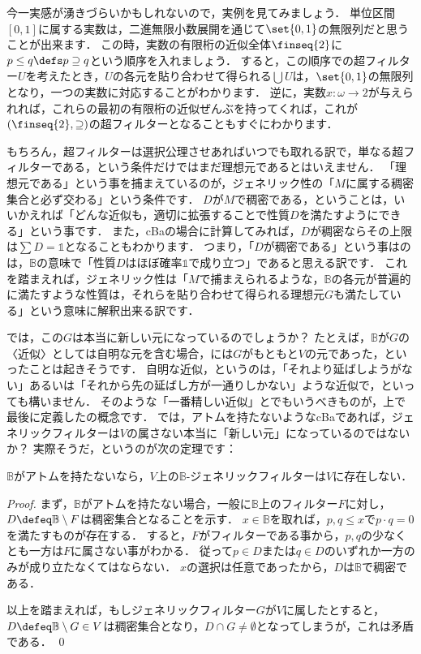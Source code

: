 \documentclass[a4j]{ltjsarticle}
\renewcommand{\emph}[1]{\textbf{\textgt{#1}}}
\begin{document}
今一実感が湧きづらいかもしれないので，実例を見てみましょう．
単位区間$[0,1]$に属する実数は，二進無限小数展開を通じて$\set{0, 1}$の無限列だと思うことが出来ます．
この時，実数の有限桁の近似全体$\finseq{2}$に$p \leq q \defs p \supseteq q$という順序を入れましょう．
すると，この順序での超フィルター$U$を考えたとき，$U$の各元を貼り合わせて得られる$\bigcup U$は，$\set{0, 1}$の無限列となり，一つの実数に対応することがわかります．
逆に，実数$x : \omega \to 2$が与えられれば，これらの最初の有限桁の近似ぜんぶを持ってくれば，これが$(\finseq{2}, \supseteq)$の超フィルターとなることもすぐにわかります．

もちろん，超フィルターは選択公理させあればいつでも取れる訳で，単なる超フィルターである，という条件だけではまだ理想元であるとはいえません．
「理想元である」という事を捕まえているのが，ジェネリック性の「$M$に属する稠密集合と必ず交わる」という条件です．
$D$が$M$で稠密である，ということは，いいかえれば「どんな近似も，適切に拡張することで性質$D$を満たすようにできる」という事です．
また，cBaの場合に計算してみれば，$D$が稠密ならその上限は$\sum D = \mathds{1}$となることもわかります．
つまり，「$D$が稠密である」という事はのは，$\mathbb{B}$の意味で「性質$D$はほぼ確率$\mathds{1}$で成り立つ」であると思える訳です．
これを踏まえれば，ジェネリック性は「$M$で捕まえられるような，$\mathbb{B}$の各元が普遍的に満たすような性質は，それらを貼り合わせて得られる理想元$G$も満たしている」という意味に解釈出来る訳です．

では，この$G$は本当に新しい元になっているのでしょうか？
たとえば，$\mathbb{B}$が$G$の〈近似〉としては自明な元を含む場合，には$G$がもともと$V$の元であった，といったことは起きそうです．
自明な近似，というのは，「それより延ばしようがない」あるいは「それから先の延ばし方が一通りしかない」ような近似で，といっても構いません．
そのような「一番精しい近似」とでもいうべきものが，上で最後に定義した\emph{アトム}の概念です．
では，アトムを持たないようなcBaであれば，ジェネリックフィルターは$V$の属さない本当に「新しい元」になっているのではないか？
実際そうだ，というのが次の定理です：

\begin{theorem}
 $\mathbb{B}$がアトムを持たないなら，$V$上の$\mathbb{B}$-ジェネリックフィルターは$V$に存在しない．
\end{theorem}
\begin{proof}
 まず，$\mathbb{B}$がアトムを持たない場合，一般に$\mathbb{B}$上のフィルター$F$に対し，$D \defeq \mathbb{B} \setminus F$は稠密集合となることを示す．
 $x \in \mathbb{B}$を取れば，$p, q \leq x$で$p \cdot q = 0$を満たすものが存在する．
 すると，$F$がフィルターである事から，$p, q$の少なくとも一方は$F$に属さない事がわかる．
 従って$p \in D$または$q \in D$のいずれか一方のみが成り立たなくてはならない．
 $x$の選択は任意であったから，$D$は$\mathbb{B}$で稠密である．

 以上を踏まえれば，もしジェネリックフィルター$G$が$V$に属したとすると，$D \defeq \mathbb{B} \setminus G \in V$は稠密集合となり，$D \cap G \neq \emptyset$となってしまうが，これは矛盾である． \qed
\end{proof}
\end{document}
